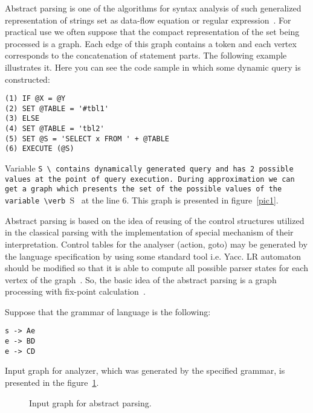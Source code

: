\documentclass{acm_proc_article-sp}
\begin{document}
Abstract parsing is one of the algorithms for syntax analysis of such generalized representation of strings set as data-flow equation or regular expression~\cite{Doh:2009:APS:1615441.1615461}. For practical use we often suppose that the compact representation of the set being processed is a graph. Each edge of this graph contains a token and each vertex corresponds to the concatenation of statement parts. The following example illustrates it. Here you can see the code sample in which some dynamic query is constructed:

\begin{verbatim} 
(1) IF @X = @Y
(2) SET @TABLE = '#tbl1'
(3) ELSE
(4) SET @TABLE = 'tbl2'
(5) SET @S = 'SELECT x FROM ' + @TABLE
(6) EXECUTE (@S)
\end{verbatim}

Variable \verb @S \ contains dynamically generated query and has 2 possible values at the point of query execution. During approximation we can get a graph which presents the set of the possible values of the variable \verb @S \ at the line 6. This graph is presented in figure~\ref{pic1}.


\begin{figure*}
    \centering
    \caption{Graph for dynamic query.}
    \label{pic1}
\end{figure*}


Abstract parsing is based on the idea of reusing of the control structures utilized in the classical parsing with the implementation of special mechanism of their interpretation. Control tables for the analyser (action, goto) may be generated by the language specification by using some standard tool i.e. Yacc. LR automaton~\cite{Grune:2010:PTP:1951778} should be modified so that it is able to compute all possible parser states for each vertex of the graph~\cite{Doh:2009:APS:1615441.1615461}. So, the basic idea of the abstract parsing is a graph processing with fix-point calculation~\cite{AlvorConf}.

Suppose that the grammar of language is the following:

\begin{verbatim} 
s -> Ae
e -> BD
e -> CD
\end{verbatim}
 
Input graph for analyzer, which was generated by the specified grammar, is presented in the figure~\ref{pic2}.

\begin{figure}
    \centering
    \caption{Input graph for abstract parsing.}
    \label{pic2}
\end{figure}
\end{document}
